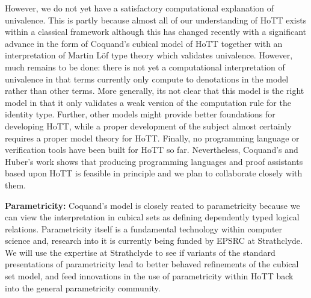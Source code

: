 \documentclass[a4paper,11pt]{article}
\begin{document}

However, we do not yet have a satisfactory computational explanation of
univalence. This is partly because almost all of our understanding of
HoTT exists within a classical framework although this has changed
recently with a significant advance in the form of Coquand's cubical
model of HoTT together with an interpretation of Martin L\"of type
theory which validates univalence. However, much remains to be done:
there is not yet a computational interpretation of univalence in that
terms currently only compute to denotations in the model rather than
other terms. More generally, its not clear that this model is the
right model in that it only validates a weak version of the
computation rule for the identity type. Further, other models might
provide better foundations for developing HoTT, while a proper
development of the subject almost certainly requires a proper model
theory for HoTT. Finally, no programming language or verification tools
have been built for HoTT so far. Nevertheless, Coquand's and Huber's
work shows that producing programming languages and proof assistants
based upon HoTT is feasible in principle and we plan to
collaborate closely with them.

{\bf Parametricity:} Coquand's model is closely reated to
parametricity because we can view the interpretation in cubical sets
as defining dependently typed logical relations.
Parametricity
itself is a fundamental technology within computer science and,
research into it is currently being funded by EPSRC at Strathclyde. We
will use the expertise at Strathclyde to see if variants of the
standard presentations of parametricity lead to better behaved
refinements of the cubical set model, and feed innovations in the use
of parametricity within HoTT back into the general parametricity
community.



\end{document}
